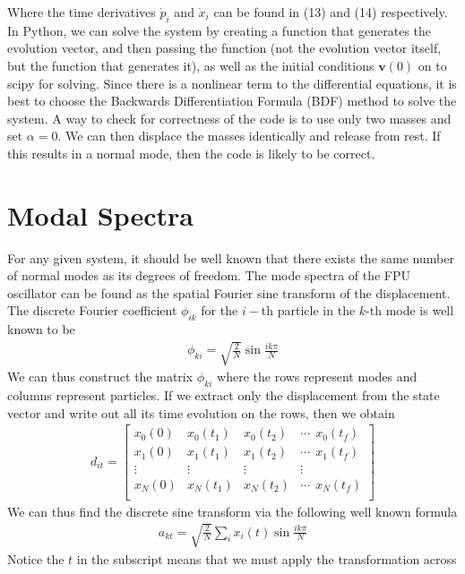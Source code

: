 \documentclass{article}
\newcommand{\ve}{\mathbf}
\begin{document}
Where the time derivatives $\dot{p}_i$ and $\dot{x}_i$ can be found in (13) and (14) respectively. In Python, 
we can solve the system by creating a function that generates the evolution vector, 
and then passing the function (not the evolution vector itself, but the function that generates it), as well as the initial conditions 
$\ve{v}(0)$ on to 
scipy for solving. Since there is a nonlinear term to the differential equations, 
it is best to choose the Backwards Differentiation Formula (BDF) method to solve the system. 
A way to check for correctness of the code is to use only two masses and set 
$\alpha=0$. We can then 
displace the masses identically and release from rest. If this results in a normal mode, then the code is likely to be correct.

\section{Modal Spectra}
For any given system, it should be well known that there exists the same number of normal modes 
as its degrees of freedom. The mode spectra of the FPU oscillator can be found as the spatial Fourier sine 
transform of the displacement. The discrete Fourier coefficient $\phi_{ik}$ for the 
$i-$th particle in the $k$-th mode is well known to be 
\begin{align}
    \phi_{ki}=\sqrt{\frac{2}{N}}\sin\frac{ik\pi}{N}
\end{align}
We can thus construct the matrix $\phi_{ki}$ where the rows represent modes and 
columns represent particles. If we extract only the displacement from the state vector
and write out all its time evolution on the rows, then we obtain 
\begin{align}
    d_{it}=\begin{bmatrix}
        x_0(0)& x_0(t_1) & x_0(t_2) &\cdots \ \  x_0(t_f)\\ 
        x_1(0)& x_1(t_1) & x_1(t_2) &\cdots \ \  x_1(t_f)\\ 
       \vdots& \vdots & \vdots & \vdots\\ 
        x_N(0)& x_N(t_1) & x_N(t_2) &\cdots \ \ x_N(t_f)\\ 
    \end{bmatrix}
\end{align} 
We can thus find the discrete sine transform via the following well known formula 
\begin{align}
    a_{kt}=\sqrt{\frac{2}{N}}\sum_ix_i(t)\sin{\frac{ik\pi}{N}}
\end{align}
Notice the $t$ in the subscript means that we must apply the transformation across 
\end{document}

